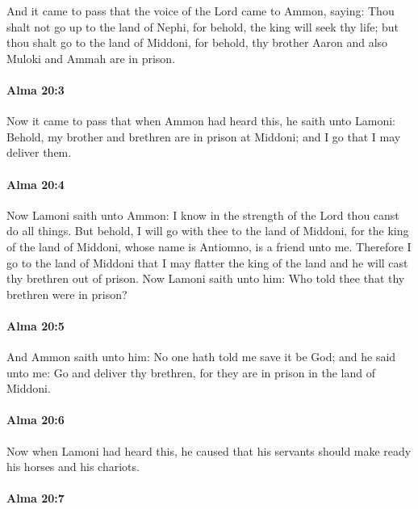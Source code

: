 			And it came to pass that the voice of the Lord came to Ammon, saying:
			Thou shalt not go up to the land of Nephi,
			for behold, the king will seek thy life;
			but thou shalt go to the land of Middoni,
			for behold, thy brother Aaron and also Muloki and Ammah are in prison.

		\paragraph{Alma 20:3} %
			\label{ALMA-20-3}

			Now it came to pass that when Ammon had heard this,
			he saith unto Lamoni:
			Behold, my brother and brethren are in prison at Middoni;
			and I go that I may deliver them.

		\paragraph{Alma 20:4} %
			\label{ALMA-20-4}

			Now Lamoni saith unto Ammon:
			I know in the strength of the Lord thou canst do all things.
			But behold, I will go with thee to the land of Middoni,
			for the king of the land of Middoni, whose name is Antiomno, is a friend unto me.
			Therefore I go to the land of Middoni
			that I may flatter the king of the land and he will cast thy brethren out of prison.
			Now Lamoni saith unto him:
			Who told thee that thy brethren were in prison?

		\paragraph{Alma 20:5} %
			\label{ALMA-20-5}

			And Ammon saith unto him:
			No one hath told me save it be God;
			and he said unto me:
			Go and deliver thy brethren, for they are in prison in the land of Middoni.

		\paragraph{Alma 20:6} %
			\label{ALMA-20-6}

			Now when Lamoni had heard this,
			he caused that his servants should make ready his horses and his chariots.

		\paragraph{Alma 20:7} %
			\label{ALMA-20-7}

